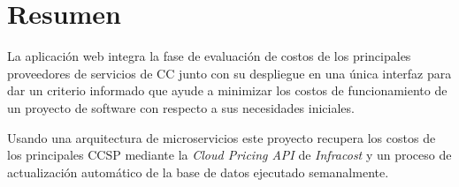 

\begingroup
\let\clearpage\relax
\let\cleardoublepage\relax
\let\cleardoublepage\relax




\chapter*{Resumen}
La aplicación web \appName integra la fase de evaluación de costos de los principales proveedores de servicios de \acrfull{CC} junto con su despliegue en una única interfaz para dar un criterio informado que ayude a minimizar los costos de funcionamiento de un proyecto de software con respecto a sus necesidades iniciales.\bigskip

Usando una arquitectura de microservicios este proyecto recupera los costos de los principales  \acrshort{CCSP} mediante la \emph{Cloud Pricing API} de \emph{Infracost} y  un proceso de actualización automático de la base de datos ejecutado semanalmente.\bigskip
\endgroup

\vfill